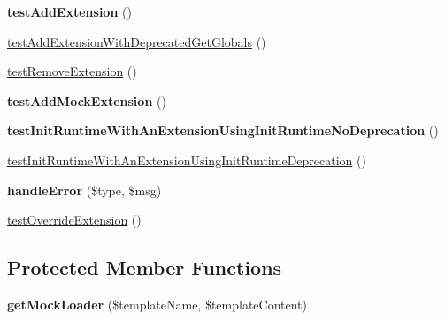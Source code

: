\begin{DoxyCompactItemize}
\item 
{\bfseries test\+Add\+Extension} ()\hypertarget{classTwig__Tests__EnvironmentTest_acf802ebdbafcdd50a3b0596a5a786641}{}\label{classTwig__Tests__EnvironmentTest_acf802ebdbafcdd50a3b0596a5a786641}

\item 
\hyperlink{classTwig__Tests__EnvironmentTest_ad201d8186409b7161b93f7143a5d34b6}{test\+Add\+Extension\+With\+Deprecated\+Get\+Globals} ()
\item 
\hyperlink{classTwig__Tests__EnvironmentTest_a8e7727228182802dd442bae669f99a53}{test\+Remove\+Extension} ()
\item 
{\bfseries test\+Add\+Mock\+Extension} ()\hypertarget{classTwig__Tests__EnvironmentTest_a8159ca3624f0876a66e97bb152edb3ae}{}\label{classTwig__Tests__EnvironmentTest_a8159ca3624f0876a66e97bb152edb3ae}

\item 
{\bfseries test\+Init\+Runtime\+With\+An\+Extension\+Using\+Init\+Runtime\+No\+Deprecation} ()\hypertarget{classTwig__Tests__EnvironmentTest_abbfdb7d384d5478f911048fb861815d2}{}\label{classTwig__Tests__EnvironmentTest_abbfdb7d384d5478f911048fb861815d2}

\item 
\hyperlink{classTwig__Tests__EnvironmentTest_a3eecec1ca4beed946d9a7581775ba492}{test\+Init\+Runtime\+With\+An\+Extension\+Using\+Init\+Runtime\+Deprecation} ()
\item 
{\bfseries handle\+Error} (\$type, \$msg)\hypertarget{classTwig__Tests__EnvironmentTest_a20430910c9ef1b8077ce31acbdf7557c}{}\label{classTwig__Tests__EnvironmentTest_a20430910c9ef1b8077ce31acbdf7557c}

\item 
\hyperlink{classTwig__Tests__EnvironmentTest_a01bd28eed5e5db54960bac6a931a05ed}{test\+Override\+Extension} ()
\end{DoxyCompactItemize}
\subsection*{Protected Member Functions}
\begin{DoxyCompactItemize}
\item 
{\bfseries get\+Mock\+Loader} (\$template\+Name, \$template\+Content)\hypertarget{classTwig__Tests__EnvironmentTest_ae52eaca9893c663155018eaf37901a04}{}\label{classTwig__Tests__EnvironmentTest_ae52eaca9893c663155018eaf37901a04}

\end{DoxyCompactItemize}


